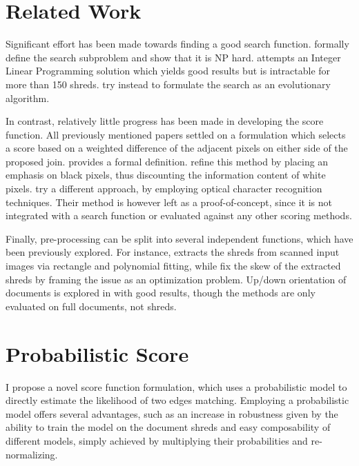 \documentclass[letterpaper]{article}
\begin{document}
\section{
\fontsize{12pt}{15pt} 
\selectfont
Related Work}
\fontsize{10pt}{12pt} 
\selectfont
Significant effort has been made towards finding a good search function. \cite{P1} formally define the search subproblem and show that it is NP hard. \cite{P2} attempts an Integer Linear Programming solution which yields good results but is intractable for more than 150 shreds. \cite{P3,P4} try instead to formulate the search as an evolutionary algorithm. 

In contrast, relatively little progress has been made in developing the score function. All previously mentioned papers settled on a formulation which selects a score based on a weighted difference of the adjacent pixels on either side of the proposed join. \cite{P7} provides a formal definition. 
\cite{P5} refine this method by placing an emphasis on black pixels, thus discounting the information content of white pixels. \cite{P8} try a different approach, by employing optical character recognition techniques. Their method is however left as a proof-of-concept, since it is not integrated with a search function or evaluated against any other scoring methods.

Finally, pre-processing can be split into several independent functions, which have been previously explored. For instance, \cite{P9} extracts the shreds from scanned input images via rectangle and polynomial fitting, while \cite{P10} fix the skew of the extracted shreds by framing the issue as an optimization problem. Up/down orientation of documents is explored in \cite{P11,P12} with good results, though the methods are only evaluated on full documents, not shreds.
\section{
\fontsize{12pt}{15pt} 
\selectfont
Probabilistic Score}
\fontsize{10pt}{12pt} 
\selectfont
I propose a novel score function formulation, which uses a probabilistic model to directly estimate the likelihood of two edges matching. Employing a probabilistic model offers several advantages, such as an increase in robustness given by the ability to train the model on the document shreds and easy composability of different models, simply achieved by multiplying their probabilities and re-normalizing.
\end{document}
